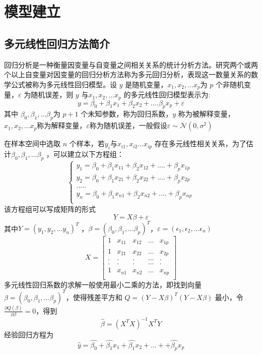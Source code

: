 \documentclass [a4paper]{article}
\begin{document}
\section{模型建立}
\subsection{多元线性回归方法简介}

回归分析是一种衡量因变量与自变量之间相关关系的统计分析方法。研究两个或两个以上自变量对因变量的回归分析方法称为多元回归分析，表现这一数量关系的数学公式被称为多元线性回归模型。设 $y$ 是随机变量，$x_1,x_2,...x_p$为 $p$ 个非随机变量，$\varepsilon$ 为随机误差，则 $y$ 与$x_1,x_2,...x_p$ 的多元线性回归模型表示为:
$$
y =\beta_0 +\beta_1x_1 +\beta_2x_2+....\beta_px_p +\varepsilon
$$
 其中 $\beta_0,\beta_1,...\beta_p$为 $p+1$ 个未知参数，称为回归系数，$y$ 称为被解释变量，$x_1,x_2,...x_p$称为解释变量，$\varepsilon$称为随机误差，一般假设$\varepsilon \sim \mathcal{N}(0,\sigma^2)$

在样本空间中选取 $n$ 个样本，若$y_i$与$x_{i1},x_{i2}...x_{ip}$ 存在多元线性相关关系，为了估计$\beta_0,\beta_1,...\beta_p$ ，可以建立以下方程组：
$$
\left\{
\begin{aligned}
y_1 = \beta_0+\beta_1x_{11}+\beta_2x_{12}+....+\beta_px_{1p}\\
y_2 = \beta_0+\beta_1x_{21}+\beta_2x_{22}+....+\beta_px_{2p}\\
.....\\
y_n = \beta_0+\beta_1x_{n1}+\beta_2x_{n2}+....+\beta_px_{np}\\
\end{aligned}
\right.
$$
该方程组可以写成矩阵的形式
$$
Y = X\beta +\varepsilon
$$
其中$Y=(y_1,y_2,...y_n)^T$ ，$\beta = (\beta_0,\beta_1,...\beta_p)^T$，$\varepsilon = (\epsilon_1,\epsilon_2,...\epsilon_n)$
$$
X = \begin{bmatrix}
1&x_{11}&x_{12}&...&x_{1p} \\
1&x_{21}&x_{22}&...&x_{2p} \\
.&.&.&...&.\\
.&.&.&...&.\\
1&x_{n1}&x_{n2}&...&x_{np} \\
\end{bmatrix}
$$
多元线性回归系数的求解一般使用最小二乘的方法，即找到向量$\beta = (\beta_0,\beta_1,...\beta_p)^T$，使得残差平方和 $Q=(Y-X\beta)^T(Y-X\beta)$ 最小，令$\frac{\partial Q(\beta)}{\partial \beta}=0$，得到
$$
\hat\beta = (X^TX)^{-1}X^TY
$$
经验回归方程为
$$
\hat y = \hat{\beta_0}+\hat{\beta_1}x_1+\hat{\beta_1}x_2+...++\hat{\beta_p}x_p
$$
\end{document}
